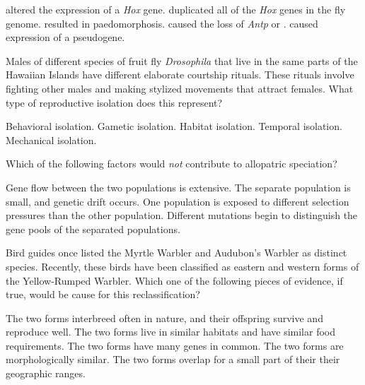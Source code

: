 \begin{choices}
\correctchoice  altered the expression of a \emph{Hox} gene. %
\choice duplicated all of the \emph{Hox} genes in the fly genome. %
\choice resulted in paedomorphosis. %
\choice caused the loss of \textit{Antp} or . %
\choice caused expression of a pseudogene. %
\end{choices}


\question
Males of different species of fruit fly \textit{Drosophila} that live in the same parts of the Hawaiian Islands have different elaborate courtship rituals. These rituals involve fighting other males and making stylized movements that attract females. What type of reproductive isolation does this represent?

\begin{choices}
\correctchoice Behavioral isolation.   %
\choice Gametic isolation.   %
\choice Habitat isolation.   %
\choice Temporal isolation.   %
\choice Mechanical isolation.   %
\end{choices}

\question
Which of the following factors would \emph{not} contribute to allopatric speciation?

\begin{choices}
\correctchoice Gene flow between the two populations is extensive.   %
\choice The separate population is small, and genetic drift occurs.   %
\choice One population is exposed to different selection pressures than the other population.   %
\choice Different mutations begin to distinguish the gene pools of the separated populations.   %
\end{choices}

\question
Bird guides once listed the Myrtle Warbler and Audubon's Warbler as distinct species. Recently, these birds have been classified as eastern and western forms of the Yellow-Rumped Warbler. Which one of the following pieces of evidence, if true, would be cause for this reclassification?

\begin{choices}
\correctchoice The two forms interbreed often in nature, and their offspring survive and reproduce well.   %
\choice The two forms live in similar habitats and have similar food requirements.   %
\choice The two forms have many genes in common.   %
\choice The two forms are morphologically similar.   %
\choice The two forms overlap for a small part of their their geographic ranges.   %
\end{choices}


